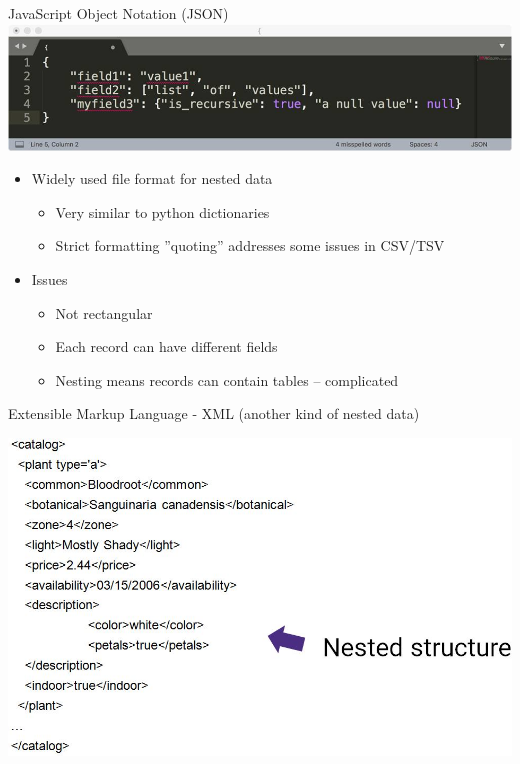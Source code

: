 \documentclass[aspectratio=169]{../latex_main/tntbeamer}  %
\begin{document}
	
	
	\begin{frame}{JavaScript Object Notation (JSON)}
	           \centering                                                                                           
	           \includegraphics[scale=.75]{Bild11}                               
	   \begin{itemize}
	       \item Widely used file format for nested data
	       \begin{itemize}
	           \item Very similar to python dictionaries
	           \item Strict formatting ”quoting” addresses some issues in CSV/TSV
	       \end{itemize}
	       \item Issues
	       \begin{itemize}
	           \item Not rectangular
	           \item Each record can have different fields
	           \item Nesting means records can contain tables – complicated
	       \end{itemize}
	   \end{itemize}
	\end{frame}
	
	
	
	\begin{frame}{Extensible Markup Language - XML (another kind of nested data)}
	                                                                                      
	           \includegraphics[scale=.4]{Bild12}                               
	\end{frame}
	
\end{document}
